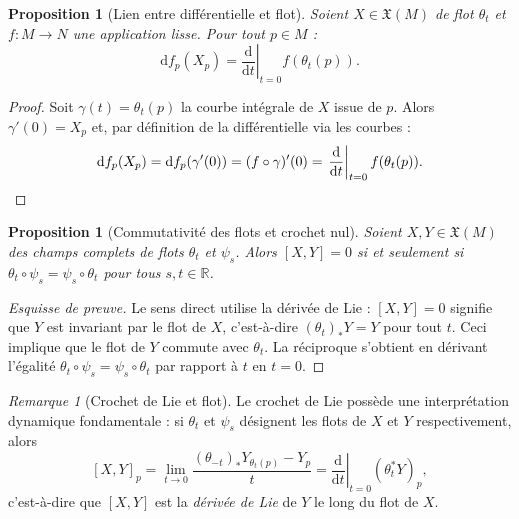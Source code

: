 \documentclass[12pt,a4paper,openany]{book}
\theoremstyle{definition}
\theoremstyle{plain}
\newtheorem{proposition}[definition]{Proposition}
\theoremstyle{remark}
\newtheorem{remarque}[definition]{Remarque}
\newcommand{\R}{\mathbb{R}}
\newcommand{\dd}{\mathrm{d}}
\begin{document}
\begin{proposition}[Lien entre différentielle et flot]\label{prop:diff-flot}
Soient $X \in \mathfrak{X}(M)$ de flot $\theta_t$ et $f : M \to N$ une application
lisse. Pour tout $p \in M$ :
\[
  \dd f_p(X_p) = \left.\frac{\dd}{\dd t}\right|_{t=0} f(\theta_t(p)).
\]
\end{proposition}

\begin{proof}
Soit $\gamma(t) = \theta_t(p)$ la courbe intégrale de $X$ issue de $p$.
Alors $\gamma'(0) = X_p$ et, par définition de la différentielle via les courbes :
\[
  \dd f_p(X_p) = \dd f_p(\gamma'(0)) = (f \circ \gamma)'(0)
  = \left.\frac{\dd}{\dd t}\right|_{t=0} f(\theta_t(p)). \qedhere
\]
\end{proof}

\begin{proposition}[Commutativité des flots et crochet nul]\label{prop:flots-commutent}
Soient $X, Y \in \mathfrak{X}(M)$ des champs complets de flots $\theta_t$ et $\psi_s$.
Alors $[X, Y] = 0$ si et seulement si $\theta_t \circ \psi_s = \psi_s \circ \theta_t$
pour tous $s, t \in \R$.
\end{proposition}

\begin{proof}[Esquisse de preuve]
Le sens direct utilise la dérivée de Lie : $[X, Y] = 0$ signifie que $Y$ est invariant
par le flot de $X$, c'est-à-dire $(\theta_t)_* Y = Y$ pour tout $t$. Ceci implique que
le flot de $Y$ commute avec $\theta_t$. La réciproque s'obtient en dérivant l'égalité
$\theta_t \circ \psi_s = \psi_s \circ \theta_t$ par rapport à $t$ en $t = 0$.
\end{proof}

\begin{remarque}[Crochet de Lie et flot]\label{rem:crochet-flot}
Le crochet de Lie possède une interprétation dynamique fondamentale : si $\theta_t$
et $\psi_s$ désignent les flots de $X$ et $Y$ respectivement, alors
\[
  [X, Y]_p = \lim_{t \to 0} \frac{(\theta_{-t})_* Y_{\theta_t(p)} - Y_p}{t}
  = \left.\frac{\dd}{\dd t}\right|_{t=0} (\theta_t^* Y)_p,
\]
c'est-à-dire que $[X,Y]$ est la \emph{dérivée de Lie} de $Y$
le long du flot de $X$.
\end{remarque}
\end{document}
